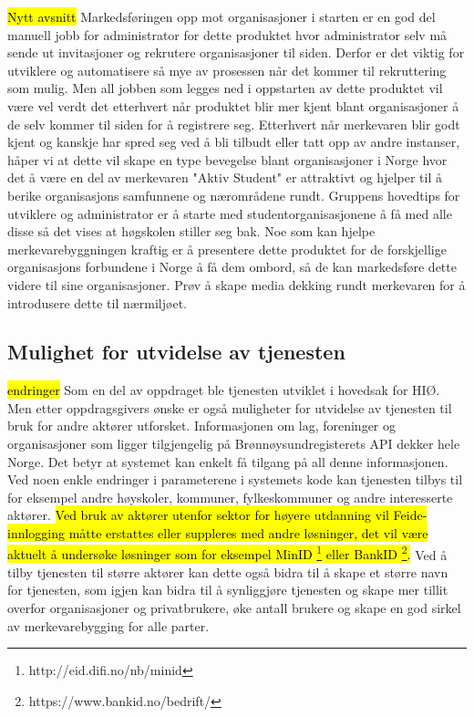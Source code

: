\hl{Nytt avsnitt}
Markedsføringen opp mot organisasjoner i starten er en god del manuell jobb for administrator for dette produktet hvor administrator selv må sende ut invitasjoner og rekrutere organisasjoner til siden. Derfor er det viktig for utviklere og automatisere så mye av prosessen når det kommer til rekruttering som mulig. Men all jobben som legges ned i oppstarten av dette produktet vil være vel verdt det etterhvert når produktet blir mer kjent blant organisasjoner å de selv kommer til siden for å registrere seg. Etterhvert når merkevaren blir godt kjent og kanskje har spred seg ved å bli tilbudt eller tatt opp av andre instanser, håper vi at dette vil skape en type bevegelse blant organisasjoner i Norge hvor det å være en del av merkevaren "Aktiv Student" er attraktivt og hjelper til å berike organisasjons samfunnene og nærområdene rundt. Gruppens hovedtips for utviklere og administrator er å starte med studentorganisasjonene å få med alle disse så det vises at høgskolen stiller seg bak. Noe som kan hjelpe merkevarebyggningen kraftig er å presentere dette produktet for de forskjellige organisasjons forbundene i Norge å få dem ombord, så de kan markedsføre dette videre til sine organisasjoner. Prøv å skape media dekking rundt merkevaren for å introdusere dette til nærmiljøet. 

\subsection{Mulighet for utvidelse av tjenesten}
\hl{endringer}
Som en del av oppdraget ble tjenesten utviklet i hovedsak for HIØ. Men etter oppdragsgivers ønske er også muligheter for utvidelse av tjenesten til bruk for andre aktører utforsket. Informasjonen om lag, foreninger og organisasjoner som ligger tilgjengelig på Brønnøysundregisterets API dekker hele Norge. Det betyr at systemet kan enkelt få tilgang på all denne informasjonen. Ved noen enkle endringer i parameterene i systemets kode kan tjenesten tilbys til for eksempel andre høyskoler, kommuner, fylkeskommuner og andre interesserte aktører. \hl{Ved bruk av aktører utenfor sektor for høyere utdanning vil Feide-innlogging måtte erstattes eller suppleres med andre løsninger, det vil være aktuelt å undersøke løsninger som for eksempel MinID \footnote{http://eid.difi.no/nb/minid} eller BankID \footnote{https://www.bankid.no/bedrift/}.} Ved å tilby tjenesten til større aktører kan dette også bidra til å skape et større navn for tjenesten, som igjen kan bidra til å synliggjøre tjenesten og skape mer tillit overfor organisasjoner og privatbrukere, øke antall brukere og skape en god sirkel av merkevarebygging for alle parter.

